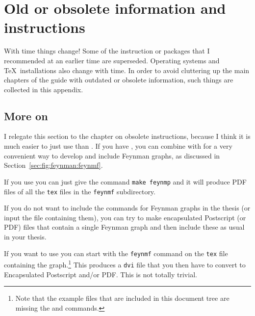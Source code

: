 \chapter{Old or obsolete information and instructions}
\label{sec:app:old}

With time things change! Some of the instruction or packages that I
recommended at an earlier time are superseded. Operating systems and
\TeX\ installations also change with time. In order to avoid
cluttering up the main chapters of the guide with outdated or obsolete
information, such things are collected in this appendix.

\section{More on }
\label{sec:app:feynmf}

I relegate this section to the chapter on obsolete instructions,
because I think it is much easier to just use  than
. If you have , you can combine
 with  for a very convenient way
to develop and include Feynman graphs, as discussed in
Section~\ref{sec:fig:feynman:feynmf}.

If you use  you can just give the command \texttt{make
feynmp} and it will produce PDF files of all the \texttt{tex} files in
the \texttt{feynmf} subdirectory.

If you do not want to include the  commands for Feynman
graphs in the thesis (or input the file containing them), you can try
to make encapsulated Postscript (or PDF) files that contain a single
Feynman graph and then include these as usual in your thesis.

If you want to use  you can start with the
\texttt{feynmf} command on the \texttt{tex} file containing the
graph.\footnote{Note that the example files that are included in this
  document tree are missing the  and
   commands.}  This produces a \texttt{dvi} file
that you then have to convert to Encapsulated Postscript and/or
PDF. This is not totally trivial.

